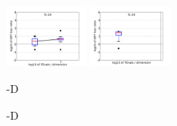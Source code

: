 \documentclass{sig-alternate}
\newcommand{\bbobdatapath}{ppdata/} %
\newcommand{\ERT}{\ensuremath{\mathrm{ERT}}}
\newcommand{\Df}{\ensuremath{\Delta f}}
\newcommand{\fopt}{\ensuremath{f_\mathrm{opt}}}
\begin{document}
\begin{figure}
{%
 }
\end{figure}
\begin{figure}
\centering
\includegraphics[width=0.24\textwidth,trim=0 0 16mm 12mm, clip]{pplogloss_05D_noiselessall}%
\includegraphics[width=0.24\textwidth,trim=7mm 0 9mm 12mm, clip]{pplogloss_20D_noiselessall}%
\\[-6.2ex]
\parbox{0.49\columnwidth}{-D}%
\parbox{0.49\columnwidth}{-D}\\[5ex]
%
\\

\caption{\label{tab:ERTloss}%
\bbobloglosstablecaption{}
}
\end{figure}
\end{document}

